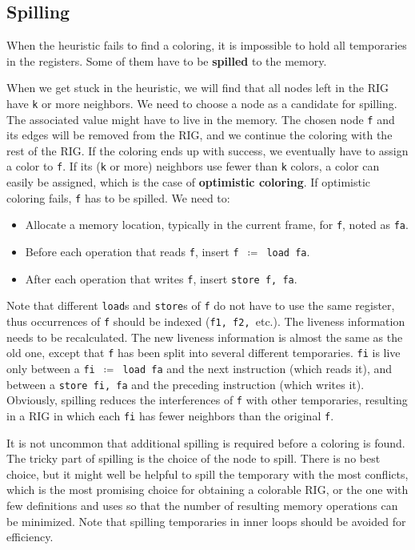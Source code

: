 \subsection{Spilling}
When the heuristic fails to find a coloring, it is impossible to hold all temporaries in the registers. Some of them have to be \textbf{spilled} to the memory. 

When we get stuck in the heuristic, we will find that all nodes left in the RIG have \texttt{k} or more neighbors. We need to choose a node as a candidate for spilling. The associated value might have to live in the memory. The chosen node \texttt{f} and its edges will be removed from the RIG, and we continue the coloring with the rest of the RIG. If the coloring ends up with success, we eventually have to assign a color to \texttt{f}. If its (\texttt{k} or more) neighbors use fewer than \texttt{k} colors, a color can easily be assigned, which is the case of \textbf{optimistic coloring}. If optimistic coloring fails, \texttt{f} has to be spilled. We need to:
\begin{itemize}
\item Allocate a memory location, typically in the current frame, for \texttt{f}, noted as \texttt{fa}.
\item Before each operation that reads \texttt{f}, insert \texttt{f $\coloneqq$ load fa}.
\item After each operation that writes \texttt{f}, insert \texttt{store f, fa}.
\end{itemize} 
Note that different \texttt{load}s and \texttt{store}s of \texttt{f} do not have to use the same register, thus occurrences of \texttt{f} should be indexed (\texttt{f1, f2, }etc.). The liveness information needs to be recalculated. The new liveness information is almost the same as the old one, except that \texttt{f} has been split into several different temporaries. \texttt{fi} is live only between a \texttt{fi $\coloneqq$ load fa} and the next instruction (which reads it), and between a \texttt{store fi, fa} and the preceding instruction (which writes it). Obviously, spilling reduces the interferences of \texttt{f} with other temporaries, resulting in a RIG in which each \texttt{fi} has fewer neighbors than the original \texttt{f}.

It is not uncommon that additional spilling is required before a coloring is found. The tricky part of spilling is the choice of the node to spill. There is no best choice, but it might well be helpful to spill the temporary with the most conflicts, which is the most promising choice for obtaining a colorable RIG, or the one with few definitions and uses so that the number of resulting memory operations can be minimized. Note that spilling temporaries in inner loops should be avoided for efficiency. 
